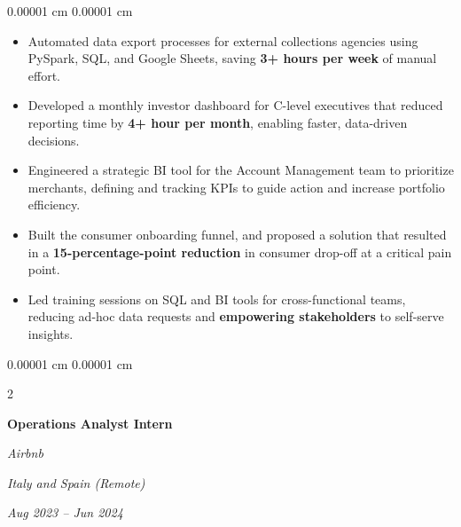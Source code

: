 \documentclass[10pt, letterpaper]{article}
\newenvironment{highlights}{
    \begin{itemize}[
        topsep=0.05 cm,
        parsep=0.05 cm,
        partopsep=0pt,
        itemsep=0pt,
        leftmargin=0.4 cm + 10pt
    ]
}{
    \end{itemize}
} %
\newenvironment{onecolentry}{
    \begin{adjustwidth}{
         0.00001 cm
    }{
        0.00001 cm
    }
}{
    \end{adjustwidth}
} %
\newenvironment{twocolentry}[2][]{
    \onecolentry
    \def\secondColumn{#2}
    \setcolumnwidth{\fill, 4.5 cm}
    \begin{paracol}{2}
}{
    \switchcolumn \raggedleft \secondColumn
    \end{paracol}
    \endonecolentry
} %
\begin{document}
        \vspace{0.15 cm}
        \begin{onecolentry}
            \begin{highlights}
                \item Automated data export processes for external collections agencies using PySpark, SQL, and Google Sheets, saving \textbf{3+ hours per week} of manual effort.
                \item Developed a monthly investor dashboard for C-level executives that reduced reporting time by \textbf{4+ hour per month}, enabling faster, data-driven decisions.
                \item Engineered a strategic BI tool for the Account Management team to prioritize merchants, defining and tracking KPIs to guide action and increase portfolio efficiency.
                \item Built the consumer onboarding funnel, and proposed a solution that resulted in a \textbf{15-percentage-point reduction} in consumer drop-off at a critical pain point.
                \item Led training sessions on SQL and BI tools for cross-functional teams, reducing ad-hoc data requests and \textbf{empowering stakeholders} to self-serve insights.
            \end{highlights}
        \end{onecolentry}


        \vspace{0.3 cm}

        \begin{twocolentry}{
        \textit{Italy and Spain (Remote)}\vspace{0 cm}    
            
        \textit{Aug 2023 – Jun 2024}}
            \textbf{Operations Analyst Intern}\vspace{0 cm}
            
            \textit{Airbnb}
        \end{twocolentry}
\end{document}
